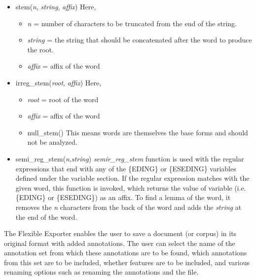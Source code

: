 \begin{itemize}
\item{stem(\textit{n}, \textit{string}, \textit{affix})} Here,
    \begin{itemize}
    \item{\textit{n}} = number of characters to be truncated from the end of the string.
    \item{\textit{string}} = the string that should be concatenated after the word to produce the root.
    \item{\textit{affix}} = affix of the word
    \end{itemize}

\item{irreg\_stem(\textit{root}, \textit{affix})} Here,
    \begin{itemize}
    \item{\textit{root}} = root of the word
    \item{\textit{affix}} = affix of the word
    \item{null\_stem()} This means words are themselves the base forms and
    should not be analyzed.
    \end{itemize}
\item{semi\_reg\_stem(\textit{n},\textit{string})}
    \textit{semir\_reg\_stem} function is used with the regular expressions
    that end with any of the \{EDING\} or \{ESEDING\} variables defined
    under the variable section. If the regular expression matches with the
    given word, this function is invoked, which returns the value of
    variable (i.e. \{EDING\} or \{ESEDING\}) as an affix. To find a lemma of
    the word, it removes the \textit{n} characters from the back of the word
    and adds the \textit{string} at the end of the word.
\end{itemize}


The Flexible Exporter enables the user to save a document (or corpus)
in its original format with added annotations. The user can select the
name of the annotation set from which these annotations are to be
found, which annotations from this set are to be included, whether
features are to be included, and various renaming options such as
renaming the annotations and the file.

